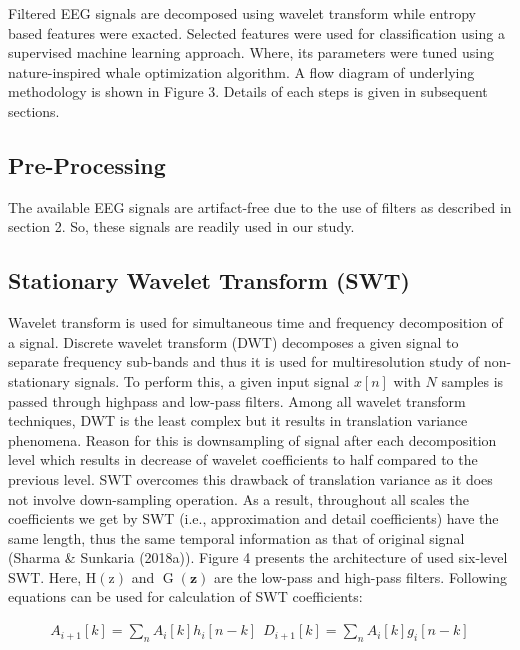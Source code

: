 Filtered EEG signals are decomposed using wavelet transform while entropy based features were exacted. Selected features were used for classification using a supervised machine learning approach. Where, its parameters were tuned using nature-inspired whale optimization algorithm. A flow diagram of underlying methodology is shown in Figure 3. Details of each steps is given in subsequent sections.

\subsection{Pre-Processing}

The available EEG signals are artifact-free due to the use of filters as described in section 2. So, these signals are readily used in our study.

\subsection{Stationary Wavelet Transform (SWT)}

Wavelet transform is used for simultaneous time and frequency decomposition of a signal. Discrete wavelet transform (DWT) decomposes a given signal to separate frequency sub-bands and thus it is used for multiresolution study of non-stationary signals. To perform this, a given input signal $x[n]$ with $N$ samples is passed through highpass and low-pass filters. Among all wavelet transform techniques, DWT is the least complex but it results in translation variance phenomena. Reason for this is downsampling of signal after each decomposition level which results in decrease of wavelet coefficients to half compared to the previous level. SWT overcomes this drawback of translation variance as it does not involve down-sampling operation. As a result, throughout all scales the coefficients we get by SWT (i.e., approximation and detail coefficients) have the same length, thus the same temporal information as that of original signal (Sharma \& Sunkaria (2018a)). Figure 4 presents the architecture of used six-level SWT. Here, $\mathrm{H}(\mathrm{z})$ and $\operatorname{G}(\mathbf{z})$ are the low-pass and high-pass filters. Following equations can be used for calculation of SWT coefficients:

\begin{equation}
\begin{array}{l}{{\displaystyle{A_{i+1}[k]=\sum_{n}A_{i}[k]h_{i}[n-k]}}}\ {{\displaystyle{}}}\ {{\displaystyle{D_{i+1}[k]=\sum_{n}A_{i}[k]g_{i}[n-k]}}}\end{array}
\end{equation}

